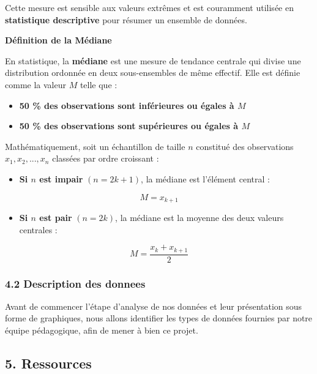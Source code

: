\documentclass[
]{article}
\providecommand{\tightlist}{%
  \setlength{\itemsep}{0pt}\setlength{\parskip}{0pt}}
\begin{document}
Cette mesure est sensible aux valeurs extrêmes et est couramment
utilisée en \textbf{statistique descriptive} pour résumer un ensemble de
données.

\textbf{Définition de la Médiane}

En statistique, la \textbf{médiane} est une mesure de tendance centrale
qui divise une distribution ordonnée en deux sous-ensembles de même
effectif. Elle est définie comme la valeur \(M\) telle que :

\begin{itemize}
\tightlist
\item
  \textbf{50 \% des observations sont inférieures ou égales à \(M\)}\\
\item
  \textbf{50 \% des observations sont supérieures ou égales à \(M\)}
\end{itemize}

Mathématiquement, soit un échantillon de taille \(n\) constitué des
observations \textbf{\(x_1, x_2, ..., x_n\)} classées par ordre
croissant :

\begin{itemize}
\tightlist
\item
  \textbf{Si \(n\) est impair} \((n = 2k + 1)\), la médiane est
  l'élément central :
\end{itemize}

\[
M = x_{k+1}
\]

\begin{itemize}
\tightlist
\item
  \textbf{Si \(n\) est pair} \((n = 2k)\), la médiane est la moyenne des
  deux valeurs centrales :
\end{itemize}

\[
M = \frac{x_k + x_{k+1}}{2}
\]

\subsubsection{4.2 Description des
donnees}\label{description-des-donnees}

Avant de commencer l'étape d'analyse de nos données et leur présentation
sous forme de graphiques, nous allons identifier les types de données
fournies par notre équipe pédagogique, afin de mener à bien ce projet.

\subsection{5. Ressources}\label{ressources}
\end{document}
